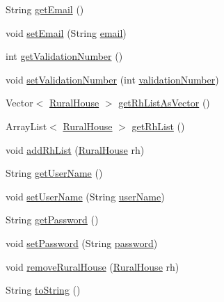 \begin{DoxyCompactItemize}
\item 
String \mbox{\hyperlink{classdomain_1_1_owner_afb08255ba011740f10d8dfe35b8168bb}{get\+Email}} ()
\item 
void \mbox{\hyperlink{classdomain_1_1_owner_a021c9e357ca913eb88688a7aaa3e298d}{set\+Email}} (String \mbox{\hyperlink{classdomain_1_1_owner_a37fce65d727c0c7d4fbc7d2c2493148c}{email}})
\item 
int \mbox{\hyperlink{classdomain_1_1_owner_a2265630ba75fb938b09b243833117069}{get\+Validation\+Number}} ()
\item 
void \mbox{\hyperlink{classdomain_1_1_owner_aeaf0bcfe8dc2183aa6c2e99ded5530c6}{set\+Validation\+Number}} (int \mbox{\hyperlink{classdomain_1_1_owner_a9d429221bf395775b4dceafc96a4658b}{validation\+Number}})
\item 
Vector$<$ \mbox{\hyperlink{classdomain_1_1_rural_house}{Rural\+House}} $>$ \mbox{\hyperlink{classdomain_1_1_owner_ab8266177e084a78aaf73947b23a20de8}{get\+Rh\+List\+As\+Vector}} ()
\item 
Array\+List$<$ \mbox{\hyperlink{classdomain_1_1_rural_house}{Rural\+House}} $>$ \mbox{\hyperlink{classdomain_1_1_owner_a49e337ac1f7dc0b15c3006c5f08800d7}{get\+Rh\+List}} ()
\item 
void \mbox{\hyperlink{classdomain_1_1_owner_a01e969e9f1e86c08e90195d6cc01132d}{add\+Rh\+List}} (\mbox{\hyperlink{classdomain_1_1_rural_house}{Rural\+House}} rh)
\item 
String \mbox{\hyperlink{classdomain_1_1_owner_a912ac7ca2dffa65d6b4c26540cc33605}{get\+User\+Name}} ()
\item 
void \mbox{\hyperlink{classdomain_1_1_owner_acf8fa109beae1cc607f9e04c051c03e5}{set\+User\+Name}} (String \mbox{\hyperlink{classdomain_1_1_owner_aa8031c9e66a0cbd90d84dc6df66a25a3}{user\+Name}})
\item 
String \mbox{\hyperlink{classdomain_1_1_owner_a111db748c1d8f6451efb9486566b2df5}{get\+Password}} ()
\item 
void \mbox{\hyperlink{classdomain_1_1_owner_a9b6bea08f2f6af298a4e7af22fc900dc}{set\+Password}} (String \mbox{\hyperlink{classdomain_1_1_owner_af66aee27508c675e6f8cab193f0c215d}{password}})
\item 
void \mbox{\hyperlink{classdomain_1_1_owner_a520de8a66f25117d263ea4c7cd5f08fa}{remove\+Rural\+House}} (\mbox{\hyperlink{classdomain_1_1_rural_house}{Rural\+House}} rh)
\item 
String \mbox{\hyperlink{classdomain_1_1_owner_ae9a6d647ea64719befbaf351f74a074c}{to\+String}} ()
\end{DoxyCompactItemize}
